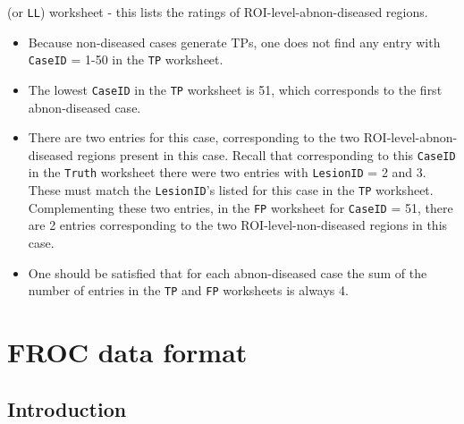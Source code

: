 \documentclass[]{book}
\providecommand{\tightlist}{%
  \setlength{\itemsep}{0pt}\setlength{\parskip}{0pt}}
\begin{document}
\begin{itemize}
 (or \texttt{LL}) worksheet - this lists the ratings of ROI-level-abnon-diseased regions.

  \begin{itemize}
  \tightlist
  \item
    Because non-diseased cases generate TPs, one does not find any entry with \texttt{CaseID} = 1-50 in the \texttt{TP} worksheet.\\
  \item
    The lowest \texttt{CaseID} in the \texttt{TP} worksheet is 51, which corresponds to the first abnon-diseased case.\\
  \item
    There are two entries for this case, corresponding to the two ROI-level-abnon-diseased regions present in this case. Recall that corresponding to this \texttt{CaseID} in the \texttt{Truth} worksheet there were two entries with \texttt{LesionID} = 2 and 3. These must match the \texttt{LesionID}'s listed for this case in the \texttt{TP} worksheet. Complementing these two entries, in the \texttt{FP} worksheet for \texttt{CaseID} = 51, there are 2 entries corresponding to the two ROI-level-non-diseased regions in this case.\\
  \item
    One should be satisfied that for each abnon-diseased case the sum of the number of entries in the \texttt{TP} and \texttt{FP} worksheets is always 4.
  \end{itemize}
\end{itemize}

\hypertarget{frocdataformat}{%
\chapter{FROC data format}\label{frocdataformat}}

\hypertarget{introduction-1}{%
\section{Introduction}\label{introduction-1}}
\end{document}
